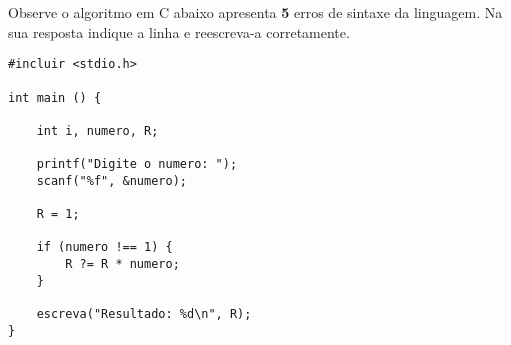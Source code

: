 
\question[10]

Observe o algoritmo em C abaixo apresenta \textbf{5} erros de sintaxe da linguagem. Na sua resposta indique a linha e reescreva-a corretamente.

\begin{lstlisting}
#incluir <stdio.h>

int main () {

	int i, numero, R;
	
	printf("Digite o numero: ");
	scanf("%f", &numero);
	
	R = 1;
	
	if (numero !== 1) {
		R ?= R * numero;
	}

	escreva("Resultado: %d\n", R);
}

\end{lstlisting}

